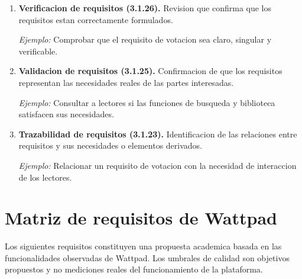 \documentclass[11pt,a4paper]{article}
\begin{document}
\begin{enumerate}
\textit{Ejemplo:} El tiempo de respuesta
de la busqueda medido en segundos.

\item \textbf{Verificacion de requisitos (3.1.26).}
Revision que confirma que los requisitos
estan correctamente formulados.

\textit{Ejemplo:} Comprobar que el
requisito de votacion sea claro,
singular y verificable.

\item \textbf{Validacion de requisitos (3.1.25).}
Confirmacion de que los requisitos
representan las necesidades reales
de las partes interesadas.

\textit{Ejemplo:} Consultar a lectores
si las funciones de busqueda y
biblioteca satisfacen sus necesidades.

\item \textbf{Trazabilidad de requisitos (3.1.23).}
Identificacion de las relaciones
entre requisitos y sus necesidades
o elementos derivados.

\textit{Ejemplo:} Relacionar un requisito
de votacion con la necesidad de
interaccion de los lectores.

\end{enumerate}


\section{Matriz de requisitos de Wattpad}

Los siguientes requisitos constituyen una
propuesta academica basada en las
funcionalidades observadas de Wattpad.
Los umbrales de calidad son objetivos
propuestos y no mediciones reales
del funcionamiento de la plataforma.
\end{document}
